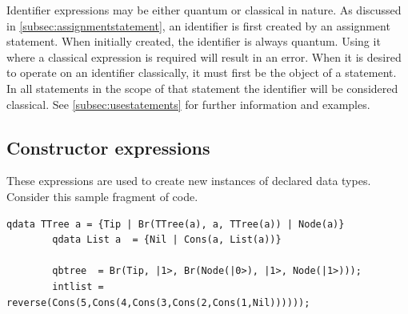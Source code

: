 Identifier expressions may be either quantum or classical in nature. 
As discussed in \vref{subsec:assignmentstatement}, an identifier is 
first created by an assignment statement. When initially created, the
identifier is always quantum. Using it where a classical expression is 
required will result in an error. When it is desired to operate on an
identifier classically, it must first be the object 
of a   statement.
In all statements in the scope of that  statement
the identifier will be considered classical. See \vref{subsec:usestatements}
for further information and examples.

\subsection{Constructor expressions}\label{subsec:constructorexpressions}
These expressions are used to create new instances of declared data types.
Consider this sample fragment of code.

{\begin{singlespace}
\begin{lstlisting}[style=linqpl]
        qdata TTree a = {Tip | Br(TTree(a), a, TTree(a)) | Node(a)}
        qdata List a  = {Nil | Cons(a, List(a))}

        qbtree  = Br(Tip, |1>, Br(Node(|0>), |1>, Node(|1>)));
        intlist = reverse(Cons(5,Cons(4,Cons(3,Cons(2,Cons(1,Nil))))));
\end{lstlisting}
\end{singlespace}
}

